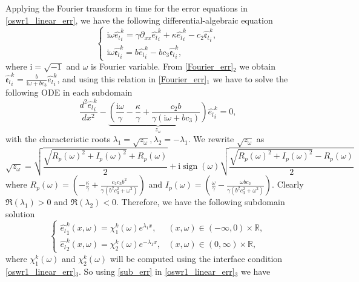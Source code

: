 \documentclass[11pt]{article}
\DeclareMathOperator{\sign}{sign}
\begin{document}
Applying the Fourier transform in time for the error equations in \eqref{oswr1_linear_err}, we have the following differential-algebraic equation
\begin{equation}\label{Fourier_err}
\begin{cases}
\mathrm{i}\omega {\widehat{e_l}}_i^{k} = \gamma \partial_{xx} {\widehat{e_l}}_i^{k} +\kappa {\widehat{e_l}}_i^{k} -c_2{\widehat{\mathfrak{e}_l}}_i^{k},\\
\mathrm{i}\omega {\widehat{\mathfrak{e}_l}}_i^{k}  = b{\widehat{e_l}}_i^{k} - bc_3{\widehat{\mathfrak{e}_l}}_i^{k},
\end{cases}
\end{equation}
where $\mathrm{i}=\sqrt{-1}$ and $\omega$ is Fourier variable. From \eqref{Fourier_err}$_2$ we obtain ${\widehat{\mathfrak{e}_l}}_i^{k} = \frac{b}{\mathrm{i}\omega + bc_3}{\widehat{e_l}}_i^{k}$, and using this relation in \eqref{Fourier_err}$_1$ we have to solve the following ODE in each subdomain
\begin{equation}
\frac{d^2 {\widehat{e_l}}_i^{k}}{d x^2} - \underbrace{\left( \frac{\mathrm{i}\omega}{\gamma} -\frac{\kappa}{\gamma} + \frac{c_2b}{\gamma(\mathrm{i}\omega + bc_3)} \right)}_{z_{\omega}}{\widehat{e_l}}_i^{k}=0,
\end{equation}
with the characteristic roots $\lambda_1=\sqrt{z_{\omega}}, \lambda_2=-\lambda_1$. We rewrite $\sqrt{z_{\omega}}$ as
\begin{equation}\label{sqrt_zw}
\sqrt{z_{\omega}}=\sqrt{\frac{\sqrt{R_p(\omega)^2 + I_p(\omega)^2} + R_p(\omega)}{2}} + \mathrm{i}\sign(\omega) \sqrt{\frac{\sqrt{R_p(\omega)^2 + I_p(\omega)^2} - R_p(\omega)}{2}}
\end{equation}
where $R_p(\omega)=\left( -\frac{\kappa}{\gamma} + \frac{c_2c_3b^2}{\gamma(b^2c_3^2+\omega^2)}\right)$ and $I_p(\omega)= \left( \frac{\omega}{\gamma} - \frac{\omega bc_2}{\gamma(b^2c_3^2 + \omega^2)}\right)$. Clearly $\Re(\lambda_1)>0$ and $\Re(\lambda_2)<0$. Therefore, we have the following subdomain solution 
\begin{equation}\label{sub_err}
\begin{cases}
{\widehat{e_l}}_1^{k}(x, \omega) = \chi_1^{k}(\omega) e^{\lambda_1 x},  & (x,\omega)\in(-\infty, 0)\times\mathbb{R},\\
{\widehat{e_l}}_2^{k}(x, \omega) = \chi_2^{k}(\omega) e^{-\lambda_1 x},  & (x,\omega)\in(0, \infty)\times\mathbb{R},
\end{cases}
\end{equation}
where $\chi_1^{k}(\omega)$ and $\chi_2^{k}(\omega)$ will be computed using the interface condition \eqref{oswr1_linear_err}$_3$. So using \eqref{sub_err} in \eqref{oswr1_linear_err}$_3$ we have  
\end{document}
